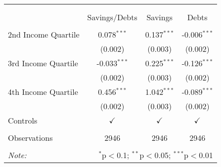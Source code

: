 \centering
\begin{tabular}{@{\extracolsep{5pt}}lccc}
\\[-1.8ex]\hline
\hline \\[-1.8ex]
\\[-1.8ex] & \multicolumn{1}{c}{Savings/Debts} & \multicolumn{1}{c}{Savings} & \multicolumn{1}{c}{Debts}  \\
\hline \\[-1.8ex]
 2nd Income Quartile & 0.078$^{***}$ & 0.137$^{***}$ & -0.006$^{***}$ \\
& (0.002) & (0.003) & (0.002) \\
 3rd Income Quartile & -0.033$^{***}$ & 0.225$^{***}$ & -0.126$^{***}$ \\
& (0.002) & (0.003) & (0.002) \\
 4th Income Quartile & 0.456$^{***}$ & 1.042$^{***}$ & -0.089$^{***}$ \\
& (0.002) & (0.003) & (0.002) \\
 Controls & $\checkmark$ & $\checkmark$ & $\checkmark$ \\
\hline \\[-1.8ex]
 Observations & 2946 & 2946 & 2946 \\
\hline
\hline \\[-1.8ex]
\textit{Note:} & \multicolumn{3}{r}{$^{*}$p$<$0.1; $^{**}$p$<$0.05; $^{***}$p$<$0.01} \\
\end{tabular}